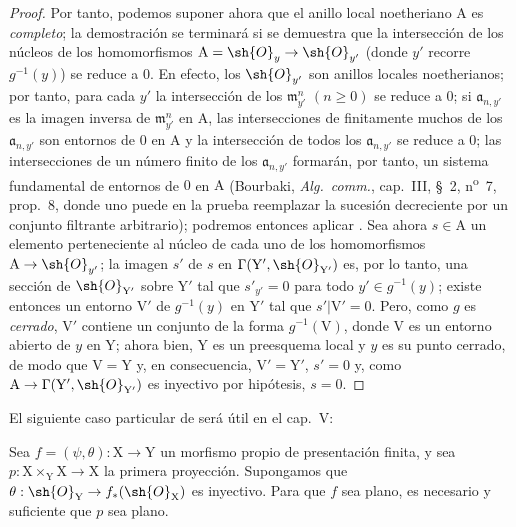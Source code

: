 \begin{proof}
Por tanto, podemos suponer ahora que el anillo local noetheriano $\mathrm{A}$ es \emph{completo}; la demostración
se terminará si se demuestra que la intersección de los núcleos de los homomorfismos
$\mathrm{A}=\sh{O}_y\to\sh{O}_{y'}$ (donde $y'$ recorre $g^{-1}(y)$) se reduce a $0$. En efecto, los $\sh{O}_{y'}$ son anillos locales
noetherianos; por tanto, para cada $y'$ la intersección de los $\mathfrak{m}_{y'}^n$ $(n\geq 0)$ se reduce a $0$;
si $\mathfrak{a}_{n,y'}$ es la imagen inversa de $\mathfrak{m}_{y'}^n$ en $\mathrm{A}$, las intersecciones de finitamente muchos de los $\mathfrak{a}_{n,y'}$ son
entornos de $0$ en $\mathrm{A}$ y la intersección de todos los $\mathfrak{a}_{n,y'}$ se reduce a $0$; las intersecciones de
un número finito de los $\mathfrak{a}_{n,y'}$ formarán, por tanto, un sistema fundamental de entornos de $0$ en $\mathrm{A}$
(Bourbaki, \emph{Alg.\ comm.}, cap.~III, \S~2, n\textsuperscript{o}~7, prop.~8, donde uno puede en la prueba
reemplazar la sucesión decreciente por un conjunto filtrante arbitrario); podremos entonces
aplicar . Sea ahora $s\in\mathrm{A}$ un elemento perteneciente al núcleo de cada uno de
los homomorfismos $\mathrm{A}\to\sh{O}_{y'}$; la imagen $s'$ de $s$ en $\Gamma(\mathrm{Y}',\sh{O}_{\mathrm{Y}'})$ es, por lo tanto, una sección
de $\sh{O}_{\mathrm{Y}'}$ sobre $\mathrm{Y}'$ tal que $s'_{y'}=0$ para todo $y'\in g^{-1}(y)$; existe entonces un entorno $\mathrm{V}'$
de $g^{-1}(y)$ en $\mathrm{Y}'$ tal que $s'|\mathrm{V}'=0$. Pero, como $g$ es \emph{cerrado}, $\mathrm{V}'$ contiene un conjunto
de la forma $g^{-1}(\mathrm{V})$, donde $\mathrm{V}$ es un entorno abierto de $y$ en $\mathrm{Y}$; ahora bien, $\mathrm{Y}$ es un preesquema local
y $y$ es su punto cerrado, de modo que $\mathrm{V}=\mathrm{Y}$ y, en consecuencia, $\mathrm{V}'=\mathrm{Y}'$,
$s'=0$ y, como $\mathrm{A}\to\Gamma(\mathrm{Y}',\sh{O}_{\mathrm{Y}'})$ es inyectivo por hipótesis, $s=0$.
\end{proof}

El siguiente caso particular de  será útil en el cap.~V:

\begin{corollary}[11.5.4]
\label{IV.11.5.4}
Sea $f=(\psi,\theta):\mathrm{X}\to\mathrm{Y}$ un morfismo propio de presentación finita,
y sea $p:\mathrm{X}\times_\mathrm{Y}\mathrm{X}\to\mathrm{X}$ la primera proyección. Supongamos que $\theta:\sh{O}_\mathrm{Y}\to f_*(\sh{O}_\mathrm{X})$ es inyectivo.
Para que $f$ sea plano, es necesario y suficiente que $p$ sea plano.
\end{corollary}

